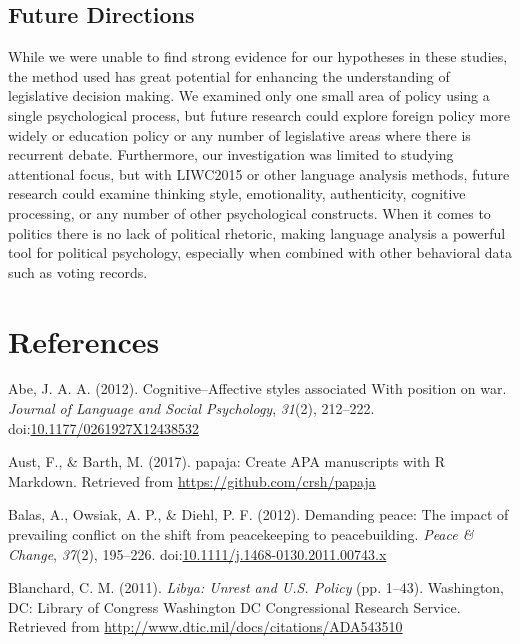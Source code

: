 \documentclass[english,,man]{apa6}
\theoremstyle{definition}
\theoremstyle{definition}
\theoremstyle{definition}
\theoremstyle{remark}
\begin{document}
\hypertarget{future-directions}{%
\subsection{Future Directions}\label{future-directions}}

While we were unable to find strong evidence for our hypotheses in these
studies, the method used has great potential for enhancing the
understanding of legislative decision making. We examined only one small
area of policy using a single psychological process, but future research
could explore foreign policy more widely or education policy or any
number of legislative areas where there is recurrent debate.
Furthermore, our investigation was limited to studying attentional
focus, but with LIWC2015 or other language analysis methods, future
research could examine thinking style, emotionality, authenticity,
cognitive processing, or any number of other psychological constructs.
When it comes to politics there is no lack of political rhetoric, making
language analysis a powerful tool for political psychology, especially
when combined with other behavioral data such as voting records.

\newpage

\hypertarget{references}{%
\section{References}\label{references}}

\setlength{\parindent}{-0.5in}
\setlength{\leftskip}{0.5in}

\hypertarget{refs}{}
\leavevmode\hypertarget{ref-Abe2012}{}%
Abe, J. A. A. (2012). Cognitive--Affective styles associated With
position on war. \emph{Journal of Language and Social Psychology},
\emph{31}(2), 212--222.
doi:\href{https://doi.org/10.1177/0261927X12438532}{10.1177/0261927X12438532}

\leavevmode\hypertarget{ref-Aust2017}{}%
Aust, F., \& Barth, M. (2017). papaja: Create APA manuscripts with R
Markdown. Retrieved from \url{https://github.com/crsh/papaja}

\leavevmode\hypertarget{ref-Balas2012}{}%
Balas, A., Owsiak, A. P., \& Diehl, P. F. (2012). Demanding peace: The
impact of prevailing conflict on the shift from peacekeeping to
peacebuilding. \emph{Peace \& Change}, \emph{37}(2), 195--226.
doi:\href{https://doi.org/10.1111/j.1468-0130.2011.00743.x}{10.1111/j.1468-0130.2011.00743.x}

\leavevmode\hypertarget{ref-Blanchard2011}{}%
Blanchard, C. M. (2011). \emph{Libya: Unrest and U.S. Policy} (pp.
1--43). Washington, DC: Library of Congress Washington DC Congressional
Research Service. Retrieved from
\url{http://www.dtic.mil/docs/citations/ADA543510}
\end{document}
